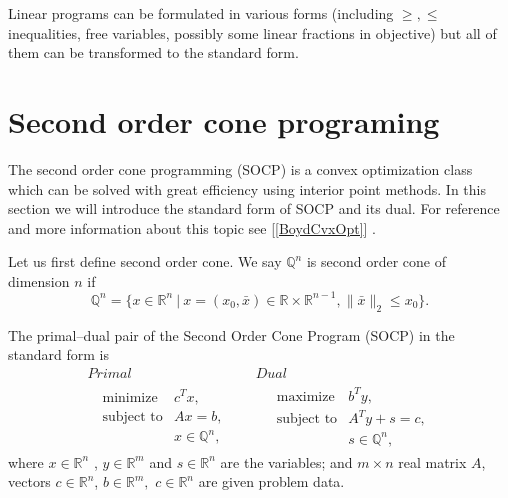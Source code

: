 \documentclass[12pt]{book}
\theoremstyle{definition}
\begin{document}
\bigskip

\rem Linear programs can be formulated in various forms (including $\geq , \leq$ inequalities, free variables, possibly some linear fractions in objective) but all of them can be transformed to the standard form.
%


\section{Second order cone programing}
\label{SectionSOCP}


The second order cone programming (SOCP) is a convex optimization class which can be solved with great efficiency using interior point methods. 
In this section we will introduce the standard form of SOCP and its dual. For reference and more information about this topic see [\ref{BoydCvxOpt}] .


Let us first define second order cone.
\label{defSOC} We say $\mathbb{Q}^n$ is second order cone of dimension $n$ if 
\begin{equation}
\mathbb{Q}^n=\{x\in \mathbb{R}^n \ | \ x = (x_0,\bar{x}) \in \mathbb{R}\times\mathbb{R}^{n-1}, \|\bar{x}\|_2\leq x_0\}.
\end{equation}


\label{defSOCP}
The primal--dual pair of the Second Order Cone Program (SOCP) in the standard form is
\begin{equation}
\label{socp} 
\begin{array}{cc}
Primal & Dual \\
\ \ \ \begin{array}{ll}
\mbox{minimize} & c^Tx,\\
\mbox{subject to}& Ax = b,\\
& x \in \mathbb{Q}^n,
\end{array} 
 \ \ \ \ \ & \ \ \ \ \ 
 \begin{array}{ll}
\mbox{maximize} & b^Ty,\\
\mbox{subject to}& A^Ty + s = c,\\
& s \in \mathbb{Q}^n,
\end{array}
\end{array}
\end{equation}
where $x\in \mathbb{R}^n$ , $y\in \mathbb{R}^m$ and $s\in \mathbb{R}^n$ are the variables; and $m\times n$ real matrix $A$, vectors $c\in \mathbb{R}^n$, $b\in \mathbb{R}^{m},$ $c\in \mathbb{R}^n$ are given problem data.
\end{document}
